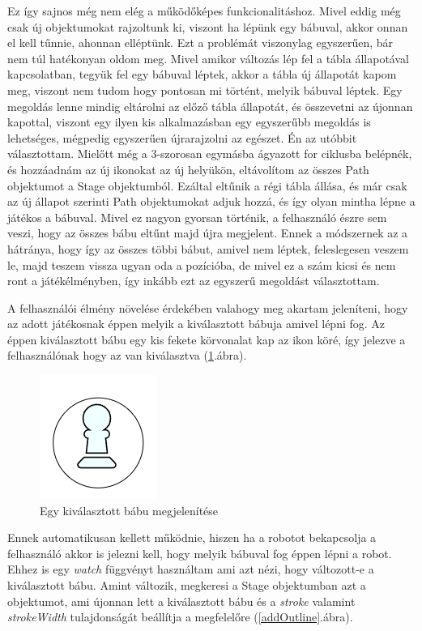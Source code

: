 \documentclass[a4paper,twoside]{article}
\begin{document}
Ez így sajnos még nem elég a működőképes funkcionalitáshoz. Mivel eddig még csak új objektumokat rajzoltunk ki, viszont ha lépünk egy bábuval, akkor onnan el kell tűnnie, ahonnan elléptünk. Ezt a problémát viszonylag egyszerűen, bár nem túl hatékonyan oldom meg. Mivel amikor változás lép fel a tábla állapotával kapcsolatban, tegyük fel egy bábuval léptek, akkor a tábla új állapotát kapom meg, viszont nem tudom hogy pontosan mi történt, melyik bábuval léptek. Egy megoldás lenne mindig eltárolni az előző tábla állapotát, és összevetni az újonnan kapottal, viszont egy ilyen kis alkalmazásban egy egyszerűbb megoldás is lehetséges, mégpedig egyszerűen újrarajzolni az egészet. Én az utóbbit választottam. Mielőtt még a 3-szorosan egymásba ágyazott for ciklusba belépnék, és hozzáadnám az új ikonokat az új helyükön, eltávolítom az összes Path objektumot a Stage objektumból. Ezáltal eltűnik a régi tábla állása, és már csak az új állapot szerinti Path objektumokat adjuk hozzá, és így olyan mintha lépne a játékos a bábuval. Mivel ez nagyon gyorsan történik, a felhasználó észre sem veszi, hogy az összes bábu eltűnt majd újra megjelent. Ennek a módszernek az a hátránya, hogy így az összes többi bábut, amivel nem léptek, feleslegesen veszem le, majd teszem vissza ugyan oda a pozícióba, de mivel ez a szám kicsi és nem ront a játékélményben, így inkább ezt az egyszerű megoldást választottam. 

A felhasználói élmény növelése érdekében valahogy meg akartam jeleníteni, hogy az adott játékosnak éppen melyik a kiválasztott bábuja amivel lépni fog. Az éppen kiválasztott bábu egy kis fekete körvonalat kap az ikon köré, így jelezve a felhasználónak hogy az van kiválasztva (\ref{babu}.ábra).
\begin{figure}
	\caption{Egy kiválasztott bábu megjelenítése}
	\label{babu}
	\centering
	\includegraphics[scale=0.5]{babu}
\end{figure}
\FloatBarrier

 Ennek automatikusan kellett működnie, hiszen ha a robotot bekapcsolja a felhasználó akkor is jelezni kell, hogy melyik bábuval fog éppen lépni a robot. Ehhez is egy \textit{watch} függvényt használtam ami azt nézi, hogy változott-e  a kiválasztott bábu. Amint változik, megkeresi a Stage objektumban azt a objektumot, ami újonnan lett a kiválasztott bábu és a \textit{stroke} valamint \textit{strokeWidth} tulajdonságát beállítja a megfelelőre (\ref{addOutline}.ábra).
\end{document}
